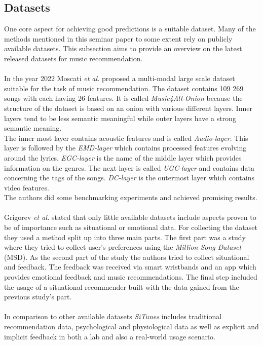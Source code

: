 \documentclass[runningheads,a4paper]{llncs}
\begin{document}
\subsection{Datasets}
One core aspect for achieving good predictions is a suitable dataset. Many of the methods mentioned in this seminar paper to some extent rely on publicly available datasets.
This subsection aims to provide an overview on the latest released datasets for music recommendation. \\
\\
In the year 2022 Moscati \textit{et al.} proposed a multi-modal large scale dataset suitable for the task of music recommendation. 
The dataset contains 109 269 songs with each having 26 features. It is called \textit{Music4All-Onion} because the structure of the dataset is based on an onion with various different layers.
Inner layers tend to be less semantic meaningful while outer layers have a strong semantic meaning. \\
The inner most layer contains acoustic features and is called \textit{Audio-layer}.
This layer is followed by the \textit{EMD-layer} which contains processed features evolving around the lyrics.
\textit{EGC-layer} is the name of the middle layer which provides information on the genres.
The next layer is called \textit{UGC-layer} and contains data concerning the tags of the songs. 
\textit{DC-layer} is the outermost layer which contains video features.\\
The authors did some benchmarking experiments and achieved promising results.\cite{moscati2022music4all}\\
\\
Grigorev \textit{et al.} stated that only little available datasets include aspects proven to be of importance such as situational or emotional data.
For collecting the dataset they used a method split up into three main parts.
The first part was a study where they tried to collect user's preferences using the \textit{Million Song Dataset} (MSD).
As the second part of the study the authors tried to collect situational and feedback.
The feedback was received via smart wristbands and an app which provides emotional feedback and music recommendations.
The final step included the usage of a situational recommender built with the data gained from the previous study's part. \\
\\
In comparison to other available datasets \textit{SiTunes} includes traditional recommendation data, 
psychological and physiological data as well as explicit and implicit feedback in both a lab and also a real-world usage scenario. \cite{grigorev2024situnes}\\
\end{document}
